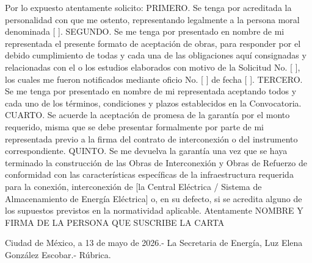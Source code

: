 Por lo expuesto atentamente solicito:
PRIMERO. Se tenga por acreditada la personalidad con que me ostento, representando legalmente a la persona moral denominada [ ].
SEGUNDO. Se me tenga por presentado en nombre de mi representada el presente formato de aceptación de obras, para responder por el debido cumplimiento de todas y cada una de las obligaciones aquí consignadas y relacionadas con el o los estudios elaborados con motivo de la Solicitud No. [ ], los cuales me fueron notificados mediante oficio No. [ ] de fecha [ ].
TERCERO. Se me tenga por presentado en nombre de mi representada aceptando todos y cada uno de los términos, condiciones y plazos establecidos en la Convocatoria.
CUARTO. Se acuerde la aceptación de promesa de la garantía por el monto requerido, misma que se debe presentar formalmente por parte de mi representada previo a la firma del contrato de interconexión o del instrumento correspondiente.
QUINTO. Se me devuelva la garantía una vez que se haya terminado la construcción de las Obras de Interconexión y Obras de Refuerzo de conformidad con las características específicas de la infraestructura requerida para la conexión, interconexión de [la Central Eléctrica / Sistema de Almacenamiento de Energía Eléctrica] o, en su defecto, si se acredita alguno de los supuestos previstos en la normatividad aplicable.
Atentamente
NOMBRE Y FIRMA DE LA PERSONA QUE SUSCRIBE LA CARTA
 
 
Ciudad de México, a 13 de mayo de 2026.- La Secretaria de Energía, Luz Elena González Escobar.- Rúbrica.\par
\endgroup
